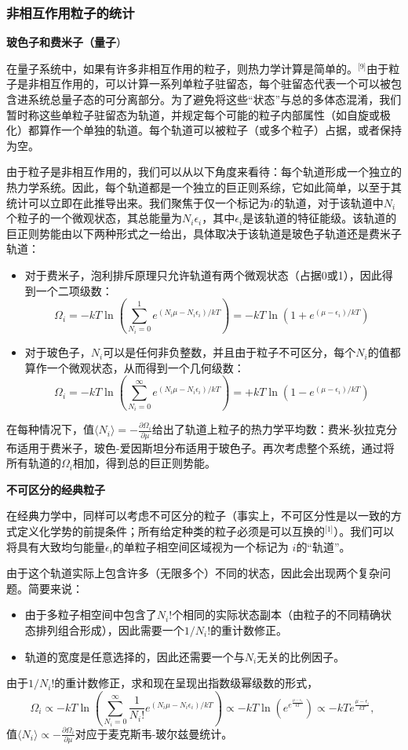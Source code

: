 \subsubsection{非相互作用粒子的统计}

\textbf{玻色子和费米子（量子}）

在量子系统中，如果有许多非相互作用的粒子，则热力学计算是简单的。\(^\text{[9]}\)由于粒子是非相互作用的，可以计算一系列单粒子驻留态，每个驻留态代表一个可以被包含进系统总量子态的可分离部分。为了避免将这些“状态”与总的多体态混淆，我们暂时称这些单粒子驻留态为轨道，并规定每个可能的粒子内部属性（如自旋或极化）都算作一个单独的轨道。每个轨道可以被粒子（或多个粒子）占据，或者保持为空。

由于粒子是非相互作用的，我们可以从以下角度来看待：每个轨道形成一个独立的热力学系统。因此，每个轨道都是一个独立的巨正则系综，它如此简单，以至于其统计可以立即在此推导出来。我们聚焦于仅一个标记为\(i\)的轨道，对于该轨道中\(N_i\)个粒子的一个微观状态，其总能量为\(N_i\epsilon_i\)，其中\(\epsilon_i\)是该轨道的特征能级。该轨道的巨正则势能由以下两种形式之一给出，具体取决于该轨道是玻色子轨道还是费米子轨道：

\begin{itemize}
\item 对于费米子，泡利排斥原理只允许轨道有两个微观状态（占据0或1），因此得到一个二项级数：
\[
\Omega_i = -kT \ln \left( \sum_{N_i=0}^{1} e^{(N_i \mu - N_i \epsilon_i)/kT} \right) = -kT \ln \left( 1 + e^{(\mu - \epsilon_i)/kT} \right)~
\]
\item 对于玻色子，\(N_i\)可以是任何非负整数，并且由于粒子不可区分，每个\(N_i\)的值都算作一个微观状态，从而得到一个几何级数：
\[
\Omega_i = -kT \ln \left( \sum_{N_i=0}^{\infty} e^{(N_i \mu - N_i \epsilon_i)/kT} \right) = +kT \ln \left( 1 - e^{(\mu - \epsilon_i)/kT} \right)~
\]
\end{itemize}
在每种情况下，值\(\langle N_i \rangle = -\frac{\partial \Omega_i}{\partial \mu}\)给出了轨道上粒子的热力学平均数：费米-狄拉克分布适用于费米子，玻色-爱因斯坦分布适用于玻色子。再次考虑整个系统，通过将所有轨道的\(\Omega_i\)相加，得到总的巨正则势能。

\textbf{不可区分的经典粒子}

在经典力学中，同样可以考虑不可区分的粒子（事实上，不可区分性是以一致的方式定义化学势的前提条件；所有给定种类的粒子必须是可以互换的\(^\text{[1]}\)）。我们可以将具有大致均匀能量\(\epsilon_i\)的单粒子相空间区域视为一个标记为 \(i\)的“轨道”。

由于这个轨道实际上包含许多（无限多个）不同的状态，因此会出现两个复杂问题。简要来说：
\begin{itemize}
\item 由于多粒子相空间中包含了\(N_i!\)个相同的实际状态副本（由粒子的不同精确状态排列组合形成），因此需要一个\(1/N_i!\)的重计数修正。
\item 轨道的宽度是任意选择的，因此还需要一个与\(N_i\)无关的比例因子。
\end{itemize}
由于\(1/N_i!\)的重计数修正，求和现在呈现出指数级幂级数的形式，
\[
\Omega_i \propto -kT \ln \left( \sum_{N_i=0}^{\infty} \frac{1}{N_i!} e^{(N_i \mu - N_i \epsilon_i)/kT} \right)
\propto -kT \ln \left( e^{e^{\frac{\mu - \epsilon_i}{kT}}} \right)
\propto -kT e^{\frac{\mu - \epsilon_i}{kT}},~
\]
值\(\langle N_i \rangle \propto -\frac{\partial \Omega_i}{\partial \mu}\)对应于麦克斯韦-玻尔兹曼统计。